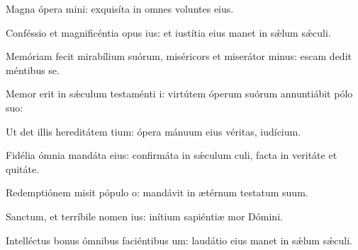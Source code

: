 \item {}

\item Magna ópera mini:\psstar{} exquisíta in omnes voluntes eius.

\item Conféssio et magnificéntia opus ius:\psstar{} et iustítia eius manet in sǽlum sǽculi.

\item Memóriam fecit mirabílium suórum,\pscross{} miséricors et miserátor minus:\psstar{} escam dedit méntibus se.

\item Memor erit in sǽculum testaménti i:\psstar{} virtútem óperum suórum annuntiábit pólo suo:

\item Ut det illis hereditátem tium:\psstar{} ópera mánuum eius véritas,  iudícium.

\item Fidélia ómnia mandáta eius:\pscross{} confirmáta in sǽculum culi,\psstar{} facta in veritáte et quitáte.

\item Redemptiónem misit pópulo o:\psstar{} mandávit in ætérnum testatum suum.

\item Sanctum, et terríbile nomen ius:\psstar{} inítium sapiéntiæ mor Dómini.

\item Intelléctus bonus ómnibus faciéntibus um:\psstar{} laudátio eius manet in sǽlum sǽculi.